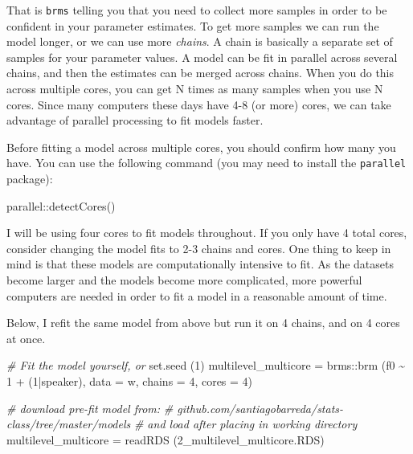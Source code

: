 \documentclass[
]{book}
\newenvironment{Shaded}{\begin{snugshade}}{\end{snugshade}}
\newcommand{\AttributeTok}[1]{\textcolor[rgb]{0.77,0.63,0.00}{#1}}
\newcommand{\CommentTok}[1]{\textcolor[rgb]{0.56,0.35,0.01}{\textit{#1}}}
\newcommand{\DecValTok}[1]{\textcolor[rgb]{0.00,0.00,0.81}{#1}}
\newcommand{\FunctionTok}[1]{\textcolor[rgb]{0.00,0.00,0.00}{#1}}
\newcommand{\NormalTok}[1]{#1}
\newcommand{\OtherTok}[1]{\textcolor[rgb]{0.56,0.35,0.01}{#1}}
\newcommand{\SpecialCharTok}[1]{\textcolor[rgb]{0.00,0.00,0.00}{#1}}
\newcommand{\StringTok}[1]{\textcolor[rgb]{0.31,0.60,0.02}{#1}}
\begin{document}
That is \texttt{brms} telling you that you need to collect more samples in order to be confident in your parameter estimates. To get more samples we can run the model longer, or we can use more \emph{chains}. A chain is basically a separate set of samples for your parameter values. A model can be fit in parallel across several chains, and then the estimates can be merged across chains. When you do this across multiple cores, you can get N times as many samples when you use N cores. Since many computers these days have 4-8 (or more) cores, we can take advantage of parallel processing to fit models faster.

Before fitting a model across multiple cores, you should confirm how many you have. You can use the following command (you may need to install the \texttt{parallel} package):

\begin{Shaded}
\begin{Highlighting}[]
\NormalTok{parallel}\SpecialCharTok{::}\FunctionTok{detectCores}\NormalTok{()}
\end{Highlighting}
\end{Shaded}

I will be using four cores to fit models throughout. If you only have 4 total cores, consider changing the model fits to 2-3 chains and cores. One thing to keep in mind is that these models are computationally intensive to fit. As the datasets become larger and the models become more complicated, more powerful computers are needed in order to fit a model in a reasonable amount of time.

Below, I refit the same model from above but run it on 4 chains, and on 4 cores at once.

\begin{Shaded}
\begin{Highlighting}[]
\CommentTok{\# Fit the model yourself, or}
\FunctionTok{set.seed}\NormalTok{ (}\DecValTok{1}\NormalTok{)}
\NormalTok{multilevel\_multicore }\OtherTok{=}  
\NormalTok{  brms}\SpecialCharTok{::}\FunctionTok{brm}\NormalTok{ (f0 }\SpecialCharTok{\textasciitilde{}} \DecValTok{1} \SpecialCharTok{+}\NormalTok{ (}\DecValTok{1}\SpecialCharTok{|}\NormalTok{speaker), }\AttributeTok{data =}\NormalTok{ w, }\AttributeTok{chains =} \DecValTok{4}\NormalTok{, }\AttributeTok{cores =} \DecValTok{4}\NormalTok{)}

\CommentTok{\# download pre{-}fit model from: }
\CommentTok{\# github.com/santiagobarreda/stats{-}class/tree/master/models}
\CommentTok{\# and load after placing in working directory}
\NormalTok{multilevel\_multicore }\OtherTok{=} \FunctionTok{readRDS}\NormalTok{ (}\StringTok{\textquotesingle{}2\_multilevel\_multicore.RDS\textquotesingle{}}\NormalTok{)}
\end{Highlighting}
\end{Shaded}
\end{document}
